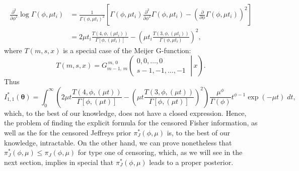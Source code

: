     \begin{equation*}
    \begin{aligned}
    \frac{\partial^2}{\partial \phi ^2} \log \Gamma(\phi,\mu t_i) &= \frac{1}{\Gamma(\phi,\mu t_i)^2}\left[\Gamma(\phi,\mu t_i)\frac{\partial^2}{\partial \phi ^2}\Gamma(\phi,\mu t_i) - \left(\frac{\partial}{\partial \phi}\Gamma(\phi,\mu t_i)\right)^2\right]\\
    &=2\mu t_i \frac{T(4,\phi,(\mu t_i))}{\Gamma\left[\phi,(\mu t_i)\right]}-\left(\mu t_i\frac{T(3,\phi,(\mu t_i))}{\Gamma(\phi,\mu t_i)}\right)^2,
    \end{aligned}
\end{equation*}
where $T(m,s,x)$ is a special case of the Meijer G-function:
\begin{equation*} 
T(m,s,x) = G_{m-1,\,m}^{\,m,\,0}\!\left(\left.{\begin{matrix}0,0,\dots ,0\\s-1,-1,\dots ,-1\end{matrix}}\;\right|\,x\right).
\end{equation*}
Thus
\begin{equation*} I_{1,1}^*(\boldsymbol{\theta}) = \int_0^\infty \left(2\mu t \frac{T(4,\phi,(\mu t))}{\Gamma\left[\phi,(\mu t)\right]}-\left(\mu t\frac{T(3,\phi,(\mu t))}{\Gamma[\phi,(\mu t)]}\right)^2\right)\frac{\mu^\phi}{\Gamma(\phi)}t^{\phi-1}\exp(-\mu t)\; dt,
\end{equation*}
which, to the best of our knowledge,  does not have a closed expression. Hence, the problem of finding the explicit formula for the censored Fisher information, as well as the for the censored Jeffreys prior $\pi_J^*\left(\phi,\mu\right)$ is, to the best of our knowledge, intractable. On the other hand, we can prove nonetheless that $\pi_J^*\left(\phi,\mu\right)\leq \pi_J(\phi,\mu)$ for type one of censoring, which, as we will see in the next section, implies in special that $\pi_J^*(\phi,\mu)$ leads to a proper posterior.

